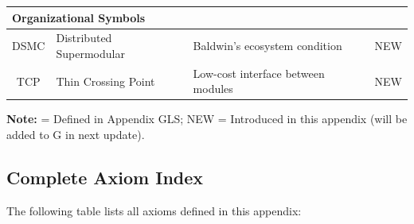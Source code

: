 \begin{longtable}{@{}clp{6cm}c@{}}
\multicolumn{4}{l}{\textbf{Organizational Symbols}} \\
\midrule
DSMC & Distributed Supermodular & Baldwin's ecosystem condition & NEW \\
TCP & Thin Crossing Point & Low-cost interface between modules & NEW \\

\end{longtable}

\textbf{Note:} \checkmark = Defined in Appendix GLS; NEW = Introduced in this appendix 
(will be added to G in next update).



\subsection{Complete Axiom Index}
\label{sec:B-axiom-index}

The following table lists all axioms defined in this appendix:

